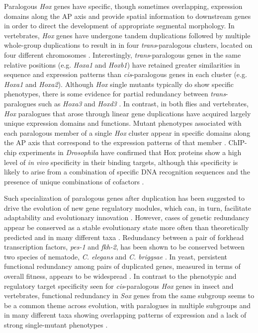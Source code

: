 Paralogous \emph{Hox} genes have specific, though sometimes overlapping, expression domains along the AP axis and provide spatial information to downstream genes in order to direct the development of appropriate segmental morphology. In vertebrates, \emph{Hox} genes have undergone tandem duplications followed by multiple whole-group duplications to result in in four \emph{trans}-paralogous clusters, located on four different chromosomes \citep{foronda_function_2009,maconochie_paralogous_1996}. Interestingly, \emph{trans}-paralogous genes in the same relative positions (e.g. \emph{Hoxa1} and \emph{Hoxb1}) have retained greater similarities in sequence and expression patterns than \emph{cis}-paralogous genes in each cluster (e.g. \emph{Hoxa1} and \emph{Hoxa2}). Although \emph{Hox} single mutants typically do show specific phenotypes, there is some evidence for partial redundancy between \emph{trans}-paralogues such as \emph{Hoxa3} and \emph{Hoxd3} \citep{greer_maintenance_2000}. In contrast, in both flies and vertebrates, \emph{Hox} paralogues that arose through linear gene duplications have acquired largely unique expression domains and functions. Mutant phenotypes associated with each paralogous member of a single \emph{Hox} cluster appear in specific domains along the AP axis that correspond to the expression patterns of that member \citep{maconochie_paralogous_1996}. ChIP-chip experiments in \emph{Drosophila} have confirmed that Hox proteins show a high level of \emph{in vivo} specificity in their binding targets, although this specificity is likely to arise from a combination of specific DNA recognition sequences and the presence of unique combinations of cofactors \citep{hueber_comparative_2007,hueber_shaping_2008,mann_chapter_2009}.

Such specialization of paralogous genes after duplication has been suggested to drive the evolution of new gene regulatory modules, which can, in turn, facilitate adaptability and evolutionary innovation \citep{espinosa-soto_specialization_2010}. However, cases of genetic redundancy appear be conserved as a stable evolutionary state more often than theoretically predicted and in many different taxa \citep{lynch_probability_2001,vavouri_widespread_????}. Redundancy between a pair of forkhead transcription factors, \emph{pes-1} and \emph{fkh-2}, has been shown to be conserved between two species of nematode, \emph{C. elegans} and \emph{C. briggsae} \citep{molin_evolutionary_2000}. In yeast, persistent functional redundancy among pairs of duplicated genes, measured in terms of overall fitness, appears to be widespread \citep{dean_pervasive_2008}. In contrast to the phenotypic and regulatory target specificity seen for \emph{cis}-paralogous \emph{Hox} genes in insect and vertebrates, functional redundancy in \emph{Sox} genes from the same subgroup seems to be a common theme across evolution, with paralogues in multiple subgroups and in many different taxa showing overlapping patterns of expression and a lack of strong single-mutant phenotypes \citep{bhattaram_organogenesis_2010,buescher_formation_2002,ferri_sox2_2004,guth_having_2008,matsui_redundant_2006,nishiguchi_sox1_1998,okuda_b1_2010,overton_evidence_2002,rizzoti_sox3_2004,uchikawa_b1_2011,uwanogho_embryonic_1995,wegner_stem_2005,wood_comparative_1999}. 

